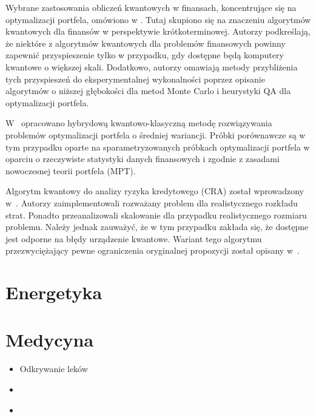 \documentclass[a4paper,11pt]{article}
\begin{document}
Wybrane zastosowania obliczeń kwantowych w finansach, koncentrujące się na optymalizacji portfela, omówiono w \cite{bouland2020prospects}. Tutaj skupiono się na znaczeniu algorytmów kwantowych dla finansów w perspektywie krótkoterminowej. Autorzy podkreślają, że niektóre z algorytmów kwantowych dla problemów finansowych powinny zapewnić przyspieszenie tylko w przypadku, gdy dostępne będą komputery kwantowe o większej skali. Dodatkowo, autorzy omawiają metody przybliżenia tych przyspieszeń do eksperymentalnej wykonalności poprzez opisanie algorytmów o niższej głębokości dla metod Monte Carlo i heurystyki QA dla optymalizacji portfela.

W~\cite{venturelli2019reverse} opracowano hybrydową kwantowo-klasyczną metodę rozwiązywania problemów optymalizacji portfela o średniej wariancji. Próbki porównawcze są w tym przypadku oparte na sparametryzowanych próbkach optymalizacji portfela w oparciu o rzeczywiste statystyki danych finansowych i zgodnie z zasadami nowoczesnej teorii portfela (MPT).


Algorytm kwantowy do analizy ryzyka kredytowego (CRA) został wprowadzony w~\cite{egger2021credit}. Autorzy zaimplementowali rozważany problem dla realistycznego rozkładu strat. Ponadto przeanalizowali skalowanie dla przypadku realistycznego rozmiaru problemu. Należy jednak zauważyć, że w tym przypadku zakłada się, że dostępne jest odporne na błędy urządzenie kwantowe. Wariant tego algorytmu przezwyciężający pewne ograniczenia oryginalnej propozycji został opisany w~\cite{dri2022towards,dri2023more}.

\newpage 

\section{Energetyka}

\cite{ajagekar2019quantum}


\section{Medycyna}
%
\begin{itemize}
\item Odkrywanie leków \cite{cao2018potential}
\item  \cite{floether2023state}
%
\item \cite{cordier2022biology}
\end{itemize}
\newpage 
\end{document}
